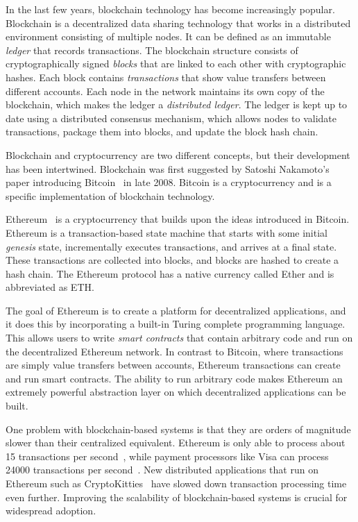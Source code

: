 \documentclass[12pt]{article}
\newcounter{protocol}
\begin{document}
In the last few years, blockchain technology has become increasingly popular.
Blockchain is a decentralized data sharing technology that works in a distributed environment consisting of multiple nodes. It can be defined as an immutable \emph{ledger} that records transactions. The blockchain structure consists of cryptographically signed \emph{blocks} that are linked to each other with cryptographic hashes. Each block contains \emph{transactions} that show value transfers between different accounts. Each node in the network maintains its own copy of the blockchain, which makes the ledger a \emph{distributed ledger}. The ledger is kept up to date using a distributed consensus mechanism, which allows nodes to validate transactions, package them into blocks, and update the block hash chain.

Blockchain and cryptocurrency are two different concepts, but their development has been intertwined. Blockchain was first suggested by Satoshi Nakamoto's paper introducing Bitcoin~\cite{bitcoin} in late 2008. Bitcoin is a cryptocurrency and is a specific implementation of blockchain technology.

Ethereum~\cite{ethereum} is a cryptocurrency that builds upon the ideas introduced in Bitcoin. Ethereum is a transaction-based state machine that starts with some initial \emph{genesis} state, incrementally executes transactions, and arrives at a final state. These transactions are collected into blocks, and blocks are hashed to create a hash chain. The Ethereum protocol has a native currency called Ether and is abbreviated as ETH.

The goal of Ethereum is to create a platform for decentralized applications, and it does this by incorporating a built-in Turing complete programming language. This allows users to write \emph{smart contracts} that contain arbitrary code and run on the decentralized Ethereum network. In contrast to Bitcoin, where transactions are simply value transfers between accounts, Ethereum transactions can create and run smart contracts. The ability to run arbitrary code makes Ethereum an extremely powerful abstraction layer on which decentralized applications can be built.

One problem with blockchain-based systems is that they are orders of magnitude slower than their centralized equivalent. Ethereum is only able to process about 15 transactions per second~\cite{vitalik-interview}, while payment processors like Visa can process \num{24000} transactions per second~\cite{visa}. New distributed applications that run on Ethereum such as CryptoKitties~\cite{cryptokitties} have slowed down transaction processing time even further. Improving the scalability of blockchain-based systems is crucial for widespread adoption.
\end{document}
